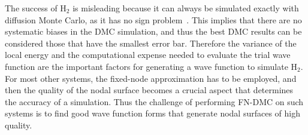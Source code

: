 \documentclass[aip,jcp,numerical,reprint]{revtex4-1}
\begin{document}
The success of H$_{2}$ is misleading because it can always be simulated exactly with diffusion Monte Carlo, as it has no sign problem~\cite{Tubman_Release}.  This implies that there are no systematic biases in the DMC simulation, and thus the best DMC results can be considered those that have the smallest error bar.  Therefore the variance of the local energy and the computational expense needed to evaluate the trial wave function are the important factors for generating a wave function to simulate H$_{2}$.  For most other systems, the fixed-node approximation has to be employed, and then the quality of the nodal surface becomes a crucial aspect that determines the accuracy of a simulation.  Thus the challenge of performing FN-DMC on such systems is to find good wave function forms that generate nodal surfaces of high quality.

\end{document}
